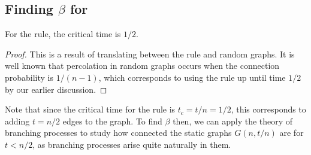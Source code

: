 \documentclass[twoside,10pt]{article}
\begin{document}
\subsection{Finding \texorpdfstring{$\beta$}{beta} for \ER}
\label{finding-beta}

\begin{lem}
	For the \ER rule, the critical time is $1/2$.
\end{lem}
\begin{proof}
	This is a result of translating between the \ER rule and \ER random graphs. It is well known \cite{princeton} that percolation in \ER random graphs occurs when the connection probability is $1/(n-1)$, which corresponds to using the \ER rule up until time $1/2$ by our earlier discussion.
\end{proof}

Note that since the critical time for the \ER rule is $t_c = t/n = 1/2$, this corresponds to adding $t=n/2$ edges to the graph. To find $\beta$ then, we can apply the theory of branching processes to study how connected the static graphs $G(n,t/n)$ are for $t < n/2$, as branching processes arise quite naturally in them.
\end{document}
